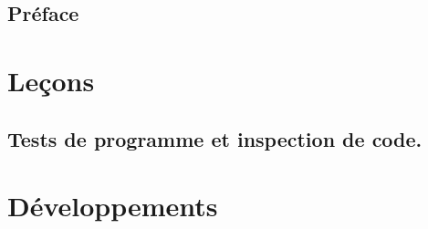 






\tableofcontents

\chapter*{Préface}
%

\part{Leçons}

%

%

\chapter{Tests de programme et inspection de code.}
\label{L3}


\makeatletter
\renewcommand{\@chapapp}{Développement}
\setcounter{chapter}{0}
\makeatother
\renewcommand\theHchapter{sec.\thechapter} %

\part{Développements}
 


